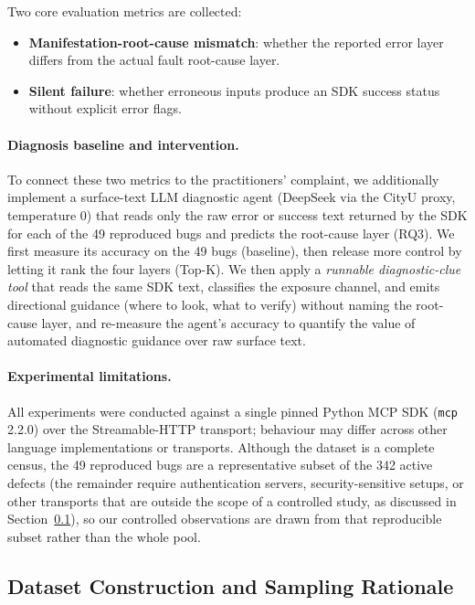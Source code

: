 Two core evaluation metrics are collected:
\begin{itemize}
  \item \textbf{Manifestation-root-cause mismatch}: whether the reported error layer differs
        from the actual fault root-cause layer.
  \item \textbf{Silent failure}: whether erroneous inputs produce an SDK success status
        without explicit error flags.
\end{itemize}

\paragraph{Diagnosis baseline and intervention.} To connect these two metrics to the
practitioners' complaint, we additionally implement a surface-text LLM diagnostic agent
(DeepSeek via the CityU proxy, temperature 0) that reads only the raw error or success text
returned by the SDK for each of the 49 reproduced bugs and predicts the root-cause layer (RQ3).
We first measure its accuracy on the 49 bugs (baseline), then release more control by letting it
rank the four layers (Top-K). We then apply a \emph{runnable diagnostic-clue tool} that reads the
same SDK text, classifies the exposure channel, and emits directional guidance (where to look,
what to verify) without naming the root-cause layer, and re-measure the agent's accuracy to
quantify the value of automated diagnostic guidance over raw surface text.

\paragraph{Experimental limitations.} All experiments were conducted against a single pinned
Python MCP SDK (\texttt{mcp} 2.2.0) over the Streamable-HTTP transport; behaviour may differ
across other language implementations or transports. Although the dataset is a complete census,
the 49 reproduced bugs are a representative subset of the 342 active defects (the remainder
require authentication servers, security-sensitive setups, or other transports that are outside
the scope of a controlled study, as discussed in Section~\ref{sec:sampling}), so our controlled
observations are drawn from that reproducible subset rather than the whole pool.

\subsection{Dataset Construction and Sampling Rationale}
\label{sec:sampling}

